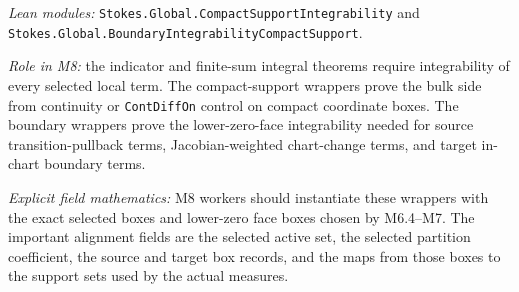 \begin{theorem}
  \label{anc:m8_integrability_package}
  \leanok
  \emph{Lean modules:}
  \texttt{Stokes.Global.CompactSupportIntegrability} and
  \texttt{Stokes.Global.BoundaryIntegrabilityCompactSupport}.

  \emph{Role in M8:}
  the indicator and finite-sum integral theorems require integrability of every
  selected local term.  The compact-support wrappers prove the bulk side from
  continuity or \texttt{ContDiffOn} control on compact coordinate boxes.  The
  boundary wrappers prove the lower-zero-face integrability needed for source
  transition-pullback terms, Jacobian-weighted chart-change terms, and target
  in-chart boundary terms.

  \emph{Explicit field mathematics:}
  M8 workers should instantiate these wrappers with the exact selected boxes
  and lower-zero face boxes chosen by M6.4--M7.  The important alignment fields
  are the selected active set, the selected partition coefficient, the source
  and target box records, and the maps from those boxes to the support sets
  used by the actual measures.
\end{theorem}

